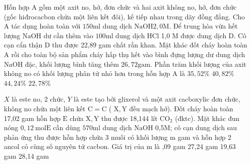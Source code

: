 \begin{vdex}
	Hỗn hợp A gồm một axit no, hở, đơn chức và hai axit không no, hở, đơn chức (gốc hiđrocacbon chứa một liên kết đôi), kế tiếp nhau trong dãy đồng đẳng. Cho $\mathrm{A}$ tác dụng hoàn toàn với $150 \mathrm{ml}$ dung dịch $\mathrm{NaOH} 2,0 \mathrm{M}$. Để trung hòa vừa hết lượng $\mathrm{NaOH}$ dư cần thêm vào $100 \mathrm{ml}$ dung dịch $\mathrm{HCl}$ 1,0 M được dung dịch D. Cô cạn cẩn thận $\mathrm{D}$ thu được 22,89 gam chất rắn khan. Mặt khác đốt cháy hoàn toàn $\mathrm{A}$ rồi cho toàn bộ sản phẩm cháy hấp thụ hết vào bình đựng lượng dư dung dịch $\mathrm{NaOH}$ đặc, khối lượng bình tăng thêm $26,72 \mathrm{gam}$. Phần trăm khối lượng của axit không no có khối lượng phân tử nhỏ hơn trong hỗn hợp $\mathrm{A}$ là
	\choice
	{%
		$35,52 \%$
	}
	{%
		$40,82 \%$
	}
	{%
		$44,24 \%$
	}
	{%
	\True	$22,78 \%$
	}
	\huongdan
	{%
		
		
		
	}			
\end{vdex}

\begin{vdex}
$X$ là este no, 2 chức, $Y$ là este tạo bởi glixerol và một axit cacboxylic đơn chức, không no chứa một liên kết $\mathrm{C}=\mathrm{C}$ ( $\mathrm{X}, \mathrm{Y}$ đều mạch hở). Đốt cháy hoàn toàn 17,02 gam hỗn hợp $\mathrm{E}$ chứa $\mathrm{X}, \mathrm{Y}$ thu được 18,144 lít $\mathrm{CO}_2$ (đktc). Mặt khác đun nóng $0,12 \mathrm{~mol} \mathrm{E}$ cần dùng $570 \mathrm{ml}$ dung dịch $\mathrm{NaOH}$ 0,5M; cô cạn dung dịch sau phản ứng thu được hỗn hợp chứa 3 muối có khối lượng $\mathrm{m}$ gam và hỗn hợp 2 ancol có cùng số nguyên tử cacbon. Giá trị của $\mathrm{m}$ là
	\choice
	{%
	,09 gam
	}
	{%
		27,24 gam
	}
	{%
		19,63 gam
	}
	{%
		28,14 gam
	}
	\huongdan
	{%
		
		
		
	}			
\end{vdex}

